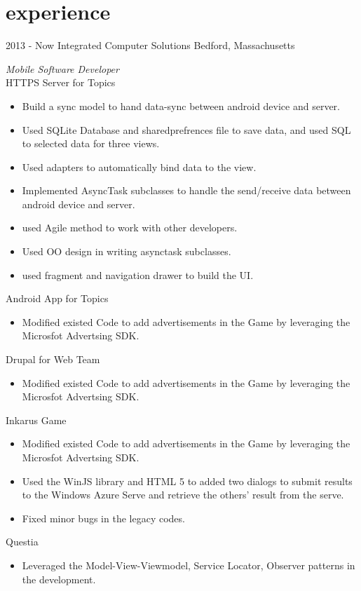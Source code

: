 \documentclass[]{ly-cv} %
\begin{document}
\section{experience}
\begin{entrylist}
\entry
{2013 - Now}
{Integrated Computer Solutions}
{Bedford, Massachusetts}
{\emph{Mobile Software Developer}\\
HTTPS Server for Topics
\begin{itemize}
  \item Build a sync model to hand data-sync between android device and server.
  \item Used SQLite Database and sharedprefrences file to save data, and used SQL to selected data for three views. 
  \item Used adapters to automatically bind data to the view.
  \item Implemented AsyncTask subclasses to handle the send/receive data between android device and server.
  \item used Agile method to work with other developers.
  \item Used OO design in writing asynctask subclasses.
  \item used fragment and navigation drawer to build the UI.
\end{itemize}
Android App for Topics
\begin{itemize}
  \item Modified existed Code to add advertisements in the Game by leveraging the Microsfot Advertsing SDK.
\end{itemize}
Drupal for Web Team
\begin{itemize}
  \item Modified existed Code to add advertisements in the Game by leveraging the Microsfot Advertsing SDK.
\end{itemize}
Inkarus Game
\begin{itemize}
  \item Modified existed Code to add advertisements in the Game by leveraging the Microsfot Advertsing SDK.
  \item Used the WinJS library and HTML 5 to added two dialogs to submit results to the Windows Azure Serve and retrieve the others' result from the serve.
  \item Fixed minor bugs in the legacy codes.
\end{itemize}
Questia
\begin{itemize}
  \item Leveraged the Model-View-Viewmodel, Service Locator, Observer patterns in the development.

\end{itemize}}
\end{entrylist}
\end{document}
